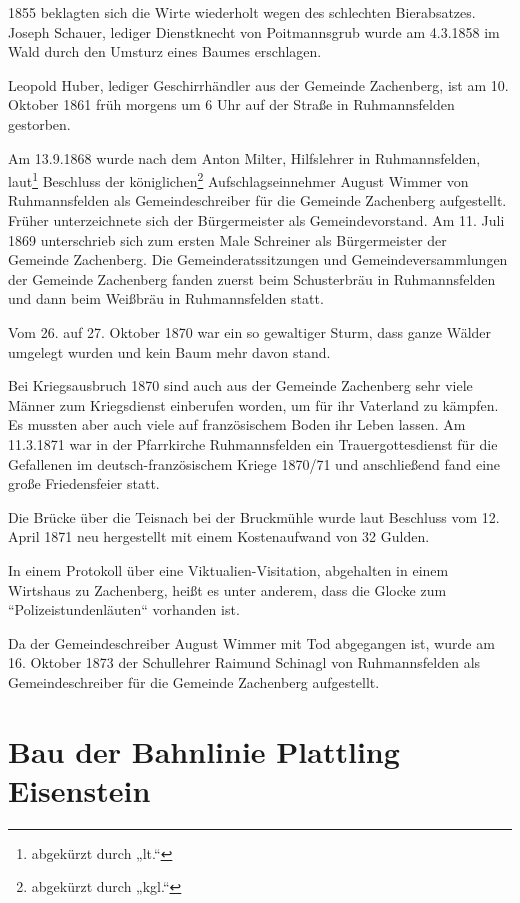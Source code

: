 \documentclass{book}
\begin{document}
1855 beklagten sich die Wirte wiederholt wegen des schlechten
Bierabsatzes. Joseph Schauer, lediger Dienstknecht von Poitmannsgrub
wurde am 4.3.1858 im Wald durch den Umsturz eines Baumes erschlagen.

Leopold Huber, lediger Geschirrhändler aus der Gemeinde Zachenberg, ist
am 10. Oktober 1861 früh morgens um 6 Uhr auf der Straße in
Ruhmannsfelden gestorben.

Am 13.9.1868 wurde nach dem Anton Milter, Hilfslehrer in Ruhmannsfelden,
laut\footnote{abgekürzt durch „lt.“} Beschluss der
königlichen\footnote{abgekürzt durch „kgl.“} Aufschlagseinnehmer August
Wimmer von Ruhmannsfelden als Gemeindeschreiber für die Gemeinde
Zachenberg aufgestellt. Früher unterzeichnete sich der Bürgermeister als
Gemeindevorstand. Am 11. Juli 1869 unterschrieb sich zum ersten Male
Schreiner als Bürgermeister der Gemeinde Zachenberg. Die
Gemeinderatssitzungen und Gemeindeversammlungen der Gemeinde Zachenberg
fanden zuerst beim Schusterbräu in Ruhmannsfelden und dann beim Weißbräu
in Ruhmannsfelden statt.

Vom 26. auf 27. Oktober 1870 war ein so gewaltiger Sturm, dass ganze
Wälder umgelegt wurden und kein Baum mehr davon stand.

Bei Kriegsausbruch 1870 sind auch aus der Gemeinde Zachenberg sehr viele
Männer zum Kriegsdienst einberufen worden, um für ihr Vaterland zu
kämpfen. Es mussten aber auch viele auf französischem Boden ihr Leben
lassen. Am 11.3.1871 war in der Pfarrkirche Ruhmannsfelden ein
Trauergottesdienst für die Gefallenen im deutsch-französischem Kriege
1870/71 und anschließend fand eine große Friedensfeier statt.

Die Brücke über die Teisnach bei der Bruckmühle wurde laut Beschluss vom
12. April 1871 neu hergestellt mit einem Kostenaufwand von 32 Gulden.

In einem Protokoll über eine Viktualien-Visitation, abgehalten in einem
Wirtshaus zu Zachenberg, heißt es unter anderem, dass die Glocke zum
“Polizeistundenläuten“ vorhanden ist.

Da der Gemeindeschreiber August Wimmer mit Tod abgegangen ist, wurde am
16. Oktober 1873 der Schullehrer Raimund Schinagl von Ruhmannsfelden als
Gemeindeschreiber für die Gemeinde Zachenberg aufgestellt.

\section{Bau der Bahnlinie Plattling Eisenstein}
\end{document}

